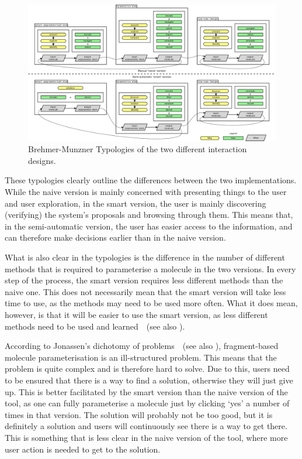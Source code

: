 \begin{figure}
\begin{center}
\includegraphics[width=\textwidth]{img/complete_typology.pdf}
\caption{Brehmer-Munzner Typologies of the two different interaction designs.}
\end{center}
\end{figure}

These typologies clearly outline the differences between the two implementations. While the naive version is mainly concerned with presenting things to the user and user exploration, in the smart version, the user is mainly discovering (verifying) the system's proposals and browsing through them. This means that, in the semi-automatic version, the user has easier access to the information, and can therefore make decisions earlier than in the naive version.

What is also clear in the typologies is the difference in the number of different methods that is required to parameterise a molecule in the two versions. In every step of the process, the smart version requires less different methods than the naive one. This does not necessarily mean that the smart version will take less time to use, as the methods may need to be used more often. What it does mean, however, is that it will be easier to use the smart version, as less different methods need to be used and learned~\cite{sweller1994cognitive}~(see also ). 

According to Jonassen's dichotomy of problems~\cite{jonassen2000toward}~(see also ), fragment-based molecule parameterisation is an ill-structured problem. This means that the problem is quite complex and is therefore hard to solve. Due to this, users need to be ensured that there is a way to find a solution, otherwise they will just give up. This is better facilitated by the smart version than the naive version of the tool, as one can fully parameterise a molecule just by clicking `yes' a number of times in that version. The solution will probably not be too good, but it is definitely a solution and users will continuously see there is a way to get there. This is something that is less clear in the naive version of the tool, where more user action is needed to get to the solution.

